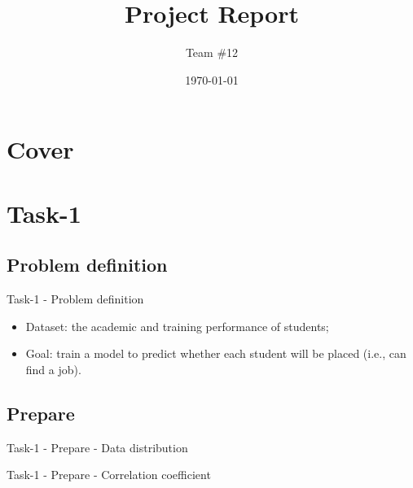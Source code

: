 \documentclass{beamer}
\title{Project Report}
\author{Team \#12}
\institute{
  \parbox{0.2\textwidth}{
    \centering WANG Zeyu
    \vspace{.25cm}
  }
  \parbox{0.2\textwidth}{
    \centering YANG Xirui
    \vspace{.25cm}
  }
  \parbox{0.2\textwidth}{
    \centering Wu Tianxiao
    \vspace{.25cm}
  }
}
\date{\today}
\begin{document}
\section*{Cover}
\frame{\titlepage}


\section{Task-1}

\subsection{Problem definition}

\begin{frame}{Task-1 - Problem definition}

  \begin{itemize}
    \item Dataset: the academic and training performance of students;
    \item Goal: train a model to predict whether each student will be placed (i.e., can find a job).
  \end{itemize}

\end{frame}

\subsection{Prepare}

\begin{frame}{Task-1 - Prepare - Data distribution}


\end{frame}

\begin{frame}{Task-1 - Prepare - Correlation coefficient}


\end{frame}
\end{document}
